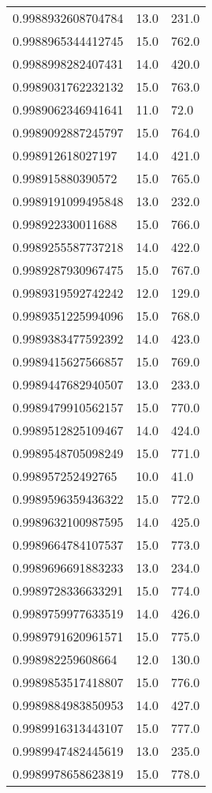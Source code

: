 \begin{center}
\begin{supertabular}[H]{p{0.30\textwidth}p{0.05\textwidth}p{0.05\textwidth}}
0.9988932608704784 & 13.0 & 231.0 \\ 
0.9988965344412745 & 15.0 & 762.0 \\ 
0.9988998282407431 & 14.0 & 420.0 \\ 
0.9989031762232132 & 15.0 & 763.0 \\ 
0.9989062346941641 & 11.0 & 72.0 \\ 
0.9989092887245797 & 15.0 & 764.0 \\ 
0.998912618027197 & 14.0 & 421.0 \\ 
0.998915880390572 & 15.0 & 765.0 \\ 
0.9989191099495848 & 13.0 & 232.0 \\ 
0.998922330011688 & 15.0 & 766.0 \\ 
0.9989255587737218 & 14.0 & 422.0 \\ 
0.9989287930967475 & 15.0 & 767.0 \\ 
0.9989319592742242 & 12.0 & 129.0 \\ 
0.9989351225994096 & 15.0 & 768.0 \\ 
0.9989383477592392 & 14.0 & 423.0 \\ 
0.9989415627566857 & 15.0 & 769.0 \\ 
0.9989447682940507 & 13.0 & 233.0 \\ 
0.9989479910562157 & 15.0 & 770.0 \\ 
0.9989512825109467 & 14.0 & 424.0 \\ 
0.9989548705098249 & 15.0 & 771.0 \\ 
0.998957252492765 & 10.0 & 41.0 \\ 
0.9989596359436322 & 15.0 & 772.0 \\ 
0.9989632100987595 & 14.0 & 425.0 \\ 
0.9989664784107537 & 15.0 & 773.0 \\ 
0.9989696691883233 & 13.0 & 234.0 \\ 
0.9989728336633291 & 15.0 & 774.0 \\ 
0.9989759977633519 & 14.0 & 426.0 \\ 
0.9989791620961571 & 15.0 & 775.0 \\ 
0.998982259608664 & 12.0 & 130.0 \\ 
0.9989853517418807 & 15.0 & 776.0 \\ 
0.9989884983850953 & 14.0 & 427.0 \\ 
0.9989916313443107 & 15.0 & 777.0 \\ 
0.9989947482445619 & 13.0 & 235.0 \\ 
0.9989978658623819 & 15.0 & 778.0 \\ 

\end{supertabular}
\end{center}
